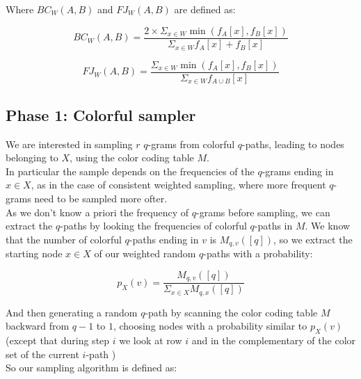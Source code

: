 Where $BC_{W}(A,B)$ and $FJ_{W}(A,B)$ are defined as:

\begin{equation}		
	BC_{W}(A,B) = \frac{ 2 \times \Sigma_{x \in W} \min(f_{A}[x], f_{B}[x]) }{ \Sigma_{x \in W} f_{A}[x] + f_{B}[x] }
\end{equation}

\begin{equation}	
	FJ_{W}(A,B) = \frac{ \Sigma_{x \in W} \min(f_{A}[x], f_{B}[x]) }{ \Sigma_{x \in W} f_{A \cup B}[x] }
\end{equation}

\subsection*{Phase 1: Colorful sampler}

We are interested in sampling $r$ $q$-grams from colorful $q$-paths, leading to nodes belonging to $X$, using the color coding table $M$.\\

In particular the sample depends on the frequencies of the $q$-grams ending in $x \in X$,
as in the case of consistent weighted sampling, where more frequent $q$-grams need to be sampled more ofter.\\

As we don't know a priori the frequency of $q$-grams before sampling, 
we can extract the $q$-paths by looking the frequencies of colorful $q$-paths in $M$. 
We know that the number of colorful $q$-paths ending in $v$ is $M_{q,v}([q])$, 
so we extract the starting node $x \in X$ of our weighted random $q$-paths with a probability:

\begin{equation}
	p_{X}(v) = \frac{ M_{q,v}([q]) }{ \Sigma_{x \in X}{M_{q, x}([q])} }
\end{equation}

And then generating a random $q$-path by scanning the color coding table $M$ 
backward from $q-1$ to $1$, choosing nodes with a probability similar to $p_{X}(v)$
(except that during step $i$ we look at row $i$ and in the complementary of the color set of the current $i$-path )\\

So our sampling algorithm is defined as:
\clearpage


